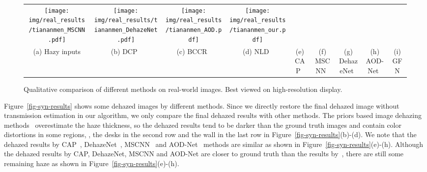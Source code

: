 \documentclass[10pt,twocolumn,letterpaper]{article}
\begin{document}
\begin{figure*}[t]
\begin{center}
\begin{tabular}{@{}ccccccccc@{}}
			\texttt{[image: img/real\_results/tiananmen\_MSCNN.pdf]} & \hspace{-0.4cm}
			\texttt{[image: img/real\_results/tiananmen\_DehazeNet.pdf]} & \hspace{-0.4cm}
			\texttt{[image: img/real\_results/tiananmen\_AOD.pdf]} & \hspace{-0.4cm}
			\texttt{[image: img/real\_results/tiananmen\_our.pdf]}\\
			(a) Hazy inputs & \hspace{-0.4cm}
			(b) DCP~\cite{he2011single} & \hspace{-0.4cm}
			(c) BCCR~\cite{meng2013efficient} & \hspace{-0.4cm}
			(d) NLD~\cite{berman2016non} & \hspace{-0.4cm}
			(e) CAP~\cite{zhu2015fast} & \hspace{-0.4cm}
			(f) MSCNN~\cite{ren2016single} & \hspace{-0.4cm}
			(g) DehazeNet~\cite{cai2016dehazenet} & \hspace{-0.4cm}
			(h) AOD-Net~\cite{li2017aod}  & \hspace{-0.4cm}
			(i) GFN
		\end{tabular}
	\end{center}
	\vspace{-0.2cm}
	\caption{Qualitative comparison of different methods on real-world images. Best viewed on high-resolution
		display.
	}
	\vspace{-0.3cm}
	\label{fig-real-results}
\end{figure*}


Figure~\ref{fig-syn-results} shows some dehazed images by different methods. Since we directly restore the final dehazed image without transmission estimation in our algorithm,
we only compare the final dehazed results with other methods.
The priors based image dehazing methods~\cite{he2011single,meng2013efficient,berman2016non} overestimate
the haze thickness, so the dehazed results tend to be darker than the ground truth
images and contain color distortions in some regions, \eg, the desks in the second row and the wall in the last row in Figure~\ref{fig-syn-results}(b)-(d).
We note that the dehazed results by CAP~\cite{zhu2015fast}, DehazeNet~\cite{cai2016dehazenet}, MSCNN~\cite{ren2016single} and AOD-Net~\cite{li2017aod} methods are similar as shown in
Figure~\ref{fig-syn-results}(e)-(h).
Although the dehazed results by CAP, DehazeNet, MSCNN and AOD-Net
are closer to ground truth than the results by~\cite{he2011single,meng2013efficient,berman2016non},
there are still some remaining haze as shown in Figure~\ref{fig-syn-results}(e)-(h).
\end{document}
